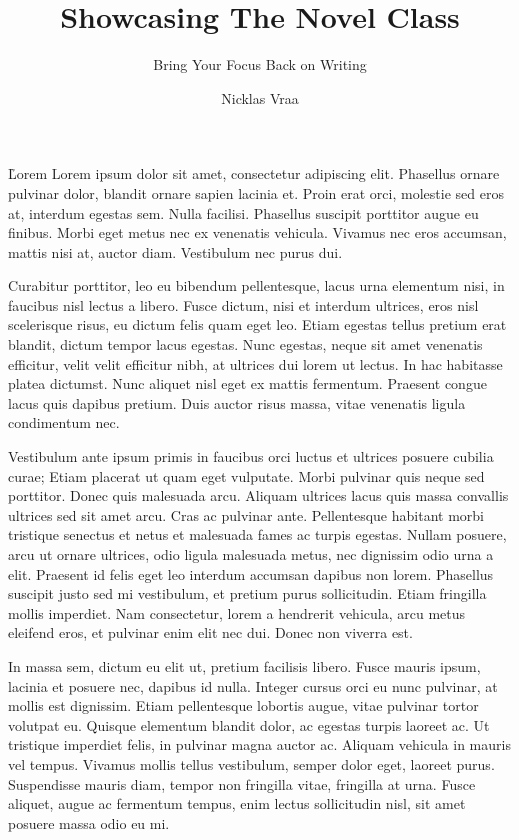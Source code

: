 \documentclass{novel}
\title     {Showcasing The Novel Class}
\subtitle  {Bring Your Focus Back on Writing}
\author    {Nicklas Vraa}
\begin{document}
\toc

\h{Lorem}
Lorem ipsum dolor sit amet, consectetur adipiscing elit. Phasellus ornare pulvinar dolor, blandit ornare sapien lacinia et. Proin erat orci, molestie sed eros at, interdum egestas sem. Nulla facilisi. Phasellus suscipit porttitor augue eu finibus. Morbi eget metus nec ex venenatis vehicula. Vivamus nec eros accumsan, mattis nisi at, auctor diam. Vestibulum nec purus dui.

Curabitur porttitor, leo eu bibendum pellentesque, lacus urna elementum nisi, in faucibus nisl lectus a libero. Fusce dictum, nisi et interdum ultrices, eros nisl scelerisque risus, eu dictum felis quam eget leo. Etiam egestas tellus pretium erat blandit, dictum tempor lacus egestas. Nunc egestas, neque sit amet venenatis efficitur, velit velit efficitur nibh, at ultrices dui lorem ut lectus. In hac habitasse platea dictumst. Nunc aliquet nisl eget ex mattis fermentum. Praesent congue lacus quis dapibus pretium. Duis auctor risus massa, vitae venenatis ligula condimentum nec.

Vestibulum ante ipsum primis in faucibus orci luctus et ultrices posuere cubilia curae; Etiam placerat ut quam eget vulputate. Morbi pulvinar quis neque sed porttitor. Donec quis malesuada arcu. Aliquam ultrices lacus quis massa convallis ultrices sed sit amet arcu. Cras ac pulvinar ante. Pellentesque habitant morbi tristique senectus et netus et malesuada fames ac turpis egestas. Nullam posuere, arcu ut ornare ultrices, odio ligula malesuada metus, nec dignissim odio urna a elit. Praesent id felis eget leo interdum accumsan dapibus non lorem. Phasellus suscipit justo sed mi vestibulum, et pretium purus sollicitudin. Etiam fringilla mollis imperdiet. Nam consectetur, lorem a hendrerit vehicula, arcu metus eleifend eros, et pulvinar enim elit nec dui. Donec non viverra est.

In massa sem, dictum eu elit ut, pretium facilisis libero. Fusce mauris ipsum, lacinia et posuere nec, dapibus id nulla. Integer cursus orci eu nunc pulvinar, at mollis est dignissim. Etiam pellentesque lobortis augue, vitae pulvinar tortor volutpat eu. Quisque elementum blandit dolor, ac egestas turpis laoreet ac. Ut tristique imperdiet felis, in pulvinar magna auctor ac. Aliquam vehicula in mauris vel tempus. Vivamus mollis tellus vestibulum, semper dolor eget, laoreet purus. Suspendisse mauris diam, tempor non fringilla vitae, fringilla at urna. Fusce aliquet, augue ac fermentum tempus, enim lectus sollicitudin nisl, sit amet posuere massa odio eu mi.
\end{document}

